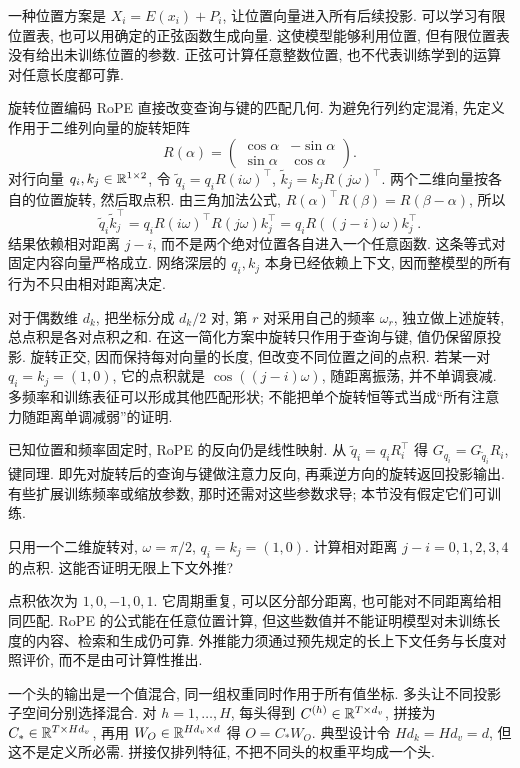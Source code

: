 一种位置方案是 $X_i=E(x_i)+P_i$, 让位置向量进入所有后续投影. 可以学习有限位置表, 也可以用确定的正弦函数生成向量. 这使模型能够利用位置, 但有限位置表没有给出未训练位置的参数. 正弦可计算任意整数位置, 也不代表训练学到的运算对任意长度都可靠.

旋转位置编码 RoPE 直接改变查询与键的匹配几何\cite{rope}. 为避免行列约定混淆, 先定义作用于二维列向量的旋转矩阵
\[
R(\alpha)=\begin{pmatrix}\cos\alpha&-\sin\alpha\\\sin\alpha&\cos\alpha\end{pmatrix}.
\]
对行向量 $q_i,k_j\in\mathbb R^{1\times2}$, 令
$\widetilde q_i=q_iR(i\omega)^\top$,
$\widetilde k_j=k_jR(j\omega)^\top$.
两个二维向量按各自的位置旋转, 然后取点积. 由三角加法公式, $R(\alpha)^\top R(\beta)=R(\beta-\alpha)$, 所以
\[
\widetilde q_i\widetilde k_j^\top
=q_iR(i\omega)^\top R(j\omega)k_j^\top
=q_iR((j-i)\omega)k_j^\top.
\]
结果依赖相对距离 $j-i$, 而不是两个绝对位置各自进入一个任意函数. 这条等式对固定内容向量严格成立. 网络深层的 $q_i,k_j$ 本身已经依赖上下文, 因而整模型的所有行为不只由相对距离决定.

对于偶数维 $d_k$, 把坐标分成 $d_k/2$ 对, 第 $r$ 对采用自己的频率 $\omega_r$, 独立做上述旋转, 总点积是各对点积之和. 在这一简化方案中旋转只作用于查询与键, 值仍保留原投影. 旋转正交, 因而保持每对向量的长度, 但改变不同位置之间的点积. 若某一对 $q_i=k_j=(1,0)$, 它的点积就是 $\cos((j-i)\omega)$, 随距离振荡, 并不单调衰减. 多频率和训练表征可以形成其他匹配形状; 不能把单个旋转恒等式当成“所有注意力随距离单调减弱”的证明.

已知位置和频率固定时, RoPE 的反向仍是线性映射. 从 $\widetilde q_i=q_iR_i^\top$ 得 $G_{q_i}=G_{\widetilde q_i}R_i$, 键同理. 即先对旋转后的查询与键做注意力反向, 再乘逆方向的旋转返回投影输出. 有些扩展训练频率或缩放参数, 那时还需对这些参数求导; 本节没有假定它们可训练.

\begin{exercise}
只用一个二维旋转对, $\omega=\pi/2$, $q_i=k_j=(1,0)$. 计算相对距离 $j-i=0,1,2,3,4$ 的点积. 这能否证明无限上下文外推?
\end{exercise}
\begin{solution}
点积依次为 $1,0,-1,0,1$. 它周期重复, 可以区分部分距离, 也可能对不同距离给相同匹配. RoPE 的公式能在任意位置计算, 但这些数值并不能证明模型对未训练长度的内容、检索和生成仍可靠. 外推能力须通过预先规定的长上下文任务与长度对照评价, 而不是由可计算性推出.
\end{solution}

一个头的输出是一个值混合, 同一组权重同时作用于所有值坐标. 多头让不同投影子空间分别选择混合. 对 $h=1,\ldots,H$, 每头得到 $C^{(h)}\in\mathbb R^{T\times d_v}$, 拼接为 $C_*\in\mathbb R^{T\times Hd_v}$, 再用 $W_O\in\mathbb R^{Hd_v\times d}$ 得 $O=C_*W_O$. 典型设计令 $Hd_k=Hd_v=d$, 但这不是定义所必需. 拼接仅排列特征, 不把不同头的权重平均成一个头.

